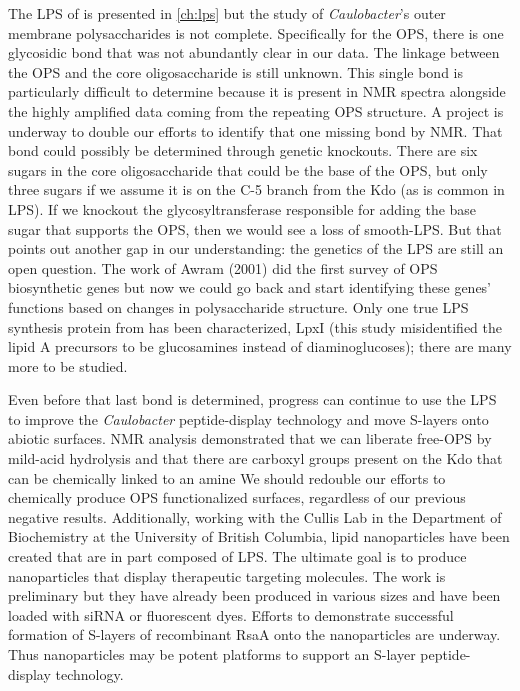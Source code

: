 The \ac{LPS} of \caulobacter{} is presented in \cref{ch:lps} but the study of \textit{Caulobacter}'s outer membrane polysaccharides is not complete. Specifically for the \ac{OPS}, there is one glycosidic bond that was not abundantly clear in our data. The linkage between the \ac{OPS} and the core oligosaccharide is still unknown. This  single bond is particularly difficult to determine because it is present in \ac{NMR} spectra alongside the highly amplified data coming from the repeating \ac{OPS} structure. A project is underway to double our efforts to identify that one missing bond by \ac{NMR}. That bond could possibly  be determined through genetic knockouts. There are six sugars in the core oligosaccharide that could be the base of the \ac{OPS}, but only three sugars if we assume it is on the C-5 branch from the Kdo (as is common in LPS). If we knockout the glycosyltransferase responsible for adding the base sugar that supports the \ac{OPS}, then we would see a loss of smooth-\ac{LPS}. But that points out another gap in our understanding: the genetics of the \caulobacter{} \ac{LPS} are still an open question. The work of Awram \etal{} (2001) did the first survey of \ac{OPS} biosynthetic genes but now we could go back and start identifying these genes' functions based on changes in polysaccharide structure. Only one true \ac{LPS} synthesis protein from \caulobacter{} has been characterized, LpxI (this study misidentified the \caulobacter lipid A precursors to be glucosamines instead of diaminoglucoses); there are many more to be studied. 

Even before that last bond is determined, progress can continue to use the \ac{LPS} to improve the \textit{Caulobacter} peptide-display technology and move \acp{S-layer} onto abiotic surfaces. \Ac{NMR} analysis demonstrated that we can liberate free-\ac{OPS} by mild-acid hydrolysis and that there are carboxyl groups present on the Kdo that can be chemically linked to an amine We should redouble our efforts to chemically produce \ac{OPS} functionalized surfaces, regardless of our previous negative results.  Additionally, working with the Cullis Lab in the Department of Biochemistry at the University of British Columbia, lipid nanoparticles have been created that are in part  composed of \caulobacter \ac{LPS}. The ultimate goal is to produce nanoparticles that display therapeutic targeting molecules. The work is preliminary but they have already been produced in various sizes and have been loaded with siRNA or fluorescent dyes. Efforts to demonstrate successful formation of \acp{S-layer} of recombinant RsaA onto the nanoparticles are underway. Thus nanoparticles  may be potent platforms to support an \ac{S-layer} peptide-display technology.

